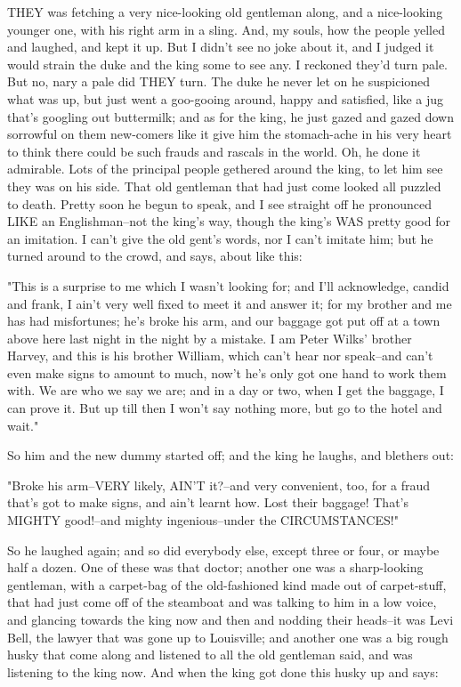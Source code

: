 THEY was fetching a very nice-looking old gentleman along, and a
nice-looking younger one, with his right arm in a sling.  And, my souls,
how the people yelled and laughed, and kept it up.  But I didn't see no
joke about it, and I judged it would strain the duke and the king some to
see any.  I reckoned they'd turn pale.  But no, nary a pale did THEY
turn. The duke he never let on he suspicioned what was up, but just went
a goo-gooing around, happy and satisfied, like a jug that's googling out
buttermilk; and as for the king, he just gazed and gazed down sorrowful
on them new-comers like it give him the stomach-ache in his very heart to
think there could be such frauds and rascals in the world.  Oh, he done
it admirable.  Lots of the principal people gethered around the king, to
let him see they was on his side.  That old gentleman that had just come
looked all puzzled to death.  Pretty soon he begun to speak, and I see
straight off he pronounced LIKE an Englishman--not the king's way, though
the king's WAS pretty good for an imitation.  I can't give the old gent's
words, nor I can't imitate him; but he turned around to the crowd, and
says, about like this:

"This is a surprise to me which I wasn't looking for; and I'll
acknowledge, candid and frank, I ain't very well fixed to meet it and
answer it; for my brother and me has had misfortunes; he's broke his arm,
and our baggage got put off at a town above here last night in the night
by a mistake.  I am Peter Wilks' brother Harvey, and this is his brother
William, which can't hear nor speak--and can't even make signs to amount
to much, now't he's only got one hand to work them with.  We are who we
say we are; and in a day or two, when I get the baggage, I can prove it.
But up till then I won't say nothing more, but go to the hotel and wait."

So him and the new dummy started off; and the king he laughs, and
blethers out:

"Broke his arm--VERY likely, AIN'T it?--and very convenient, too, for a
fraud that's got to make signs, and ain't learnt how.  Lost their
baggage! That's MIGHTY good!--and mighty ingenious--under the
CIRCUMSTANCES!"

So he laughed again; and so did everybody else, except three or four, or
maybe half a dozen.  One of these was that doctor; another one was a
sharp-looking gentleman, with a carpet-bag of the old-fashioned kind made
out of carpet-stuff, that had just come off of the steamboat and was
talking to him in a low voice, and glancing towards the king now and then
and nodding their heads--it was Levi Bell, the lawyer that was gone up to
Louisville; and another one was a big rough husky that come along and
listened to all the old gentleman said, and was listening to the king
now. And when the king got done this husky up and says:

